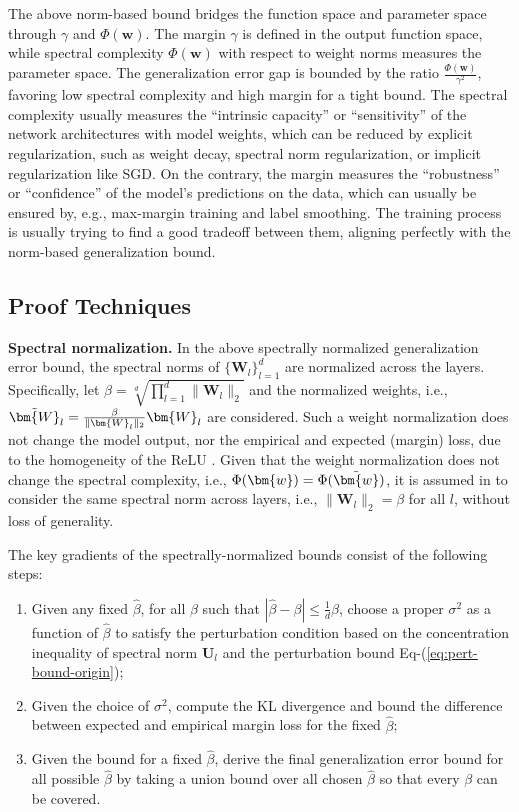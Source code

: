 \documentclass[journal]{IEEEtran} %
\def\eqref#1{Eq-(\ref{#1})}
\def\vw{{\bm{w}}}
\def\mU{{\bm{U}}}
\def\mW{{\bm{W}}}
\newcommand{\Norm}[1]{\|#1\|}
\newcommand{\Abs}[1]{|#1|}
\begin{document}
The above norm-based bound bridges the function space and parameter space through $\gamma$ and $\Phi(\vw)$. The margin $\gamma$ is defined in the output function space, while spectral complexity $\Phi(\vw)$ with respect to weight norms measures the parameter space. The generalization error gap is bounded by the ratio $\frac{\Phi(\vw)}{\gamma^2}$, favoring low spectral complexity and high margin for a tight bound. The spectral complexity usually measures the ``intrinsic capacity'' or ``sensitivity'' of the network architectures with model weights, which can be reduced by explicit regularization, such as weight decay, spectral norm regularization, or implicit regularization like SGD. On the contrary, the margin measures the ``robustness'' or ``confidence'' of the model's predictions on the data, which can usually be ensured by, e.g., max-margin training and label smoothing. The training process is usually trying to find a good tradeoff between them, aligning perfectly with the norm-based generalization bound.


\subsection{Proof Techniques}
\textbf{Spectral normalization.}
In the above spectrally normalized generalization error bound, the spectral norms of $\{\mW_l\}_{l=1}^d$ are normalized across the layers. Specifically, let $\beta=\sqrt[d]{\prod_{l=1}^d \Norm{\mW_l}_2}$ and the normalized weights, i.e., $\Tilde{\mW}_l = \frac{\beta}{\Norm{\mW_l}_2}\mW_l$ are considered. Such a weight normalization does not change the model output, nor the empirical and expected (margin) loss, due to the homogeneity of the ReLU \cite{neyshabur2018pac}. Given that the weight normalization does not change the spectral complexity, i.e., $\Phi(\vw)=\Phi(\Tilde{\vw})$, it is assumed in \cite{neyshabur2018pac} to consider the same spectral norm across layers, i.e., $\Norm{\mW_l}_2=\beta$ for all $l$, without loss of generality. 

The key gradients of the spectrally-normalized bounds consist of the following steps:
\begin{enumerate}
    \item Given any fixed $\hat{\beta}$, for all $\beta$ such that $\Abs{\hat{\beta}-\beta} \le \frac{1}{d}\beta$, choose a proper $\sigma^2$ as a function of $\hat{\beta}$ to satisfy the perturbation condition based on the concentration inequality of spectral norm $\mU_l$ and the perturbation bound \eqref{eq:pert-bound-origin};
    \item Given the choice of $\sigma^2$, compute the KL divergence and bound the difference between expected and empirical margin loss for the fixed $\hat{\beta}$;
    \item Given the bound for a fixed $\hat{\beta}$, derive the final generalization error bound for all possible $\hat{\beta}$ by taking a union bound over all chosen $\hat{\beta}$ so that every $\beta$ can be covered.
\end{enumerate}
\end{document}
